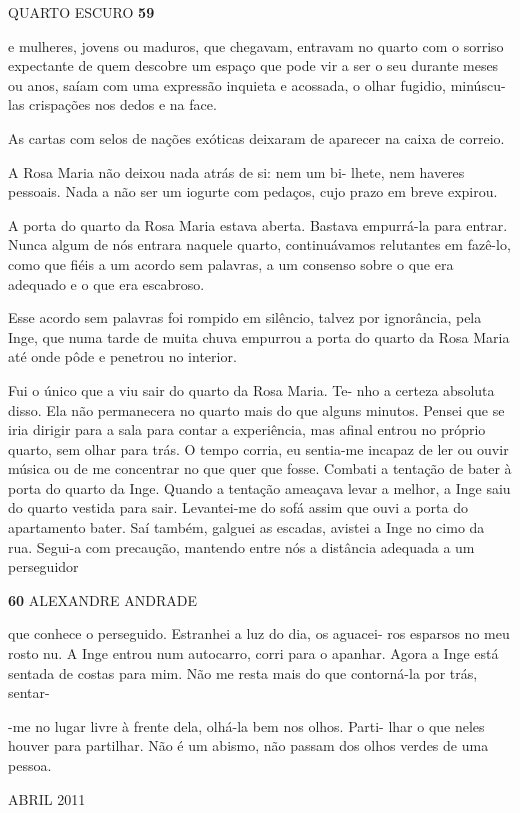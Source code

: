 QUARTO ESCURO \textbf{59}

e mulheres, jovens ou maduros, que chegavam, entravam no quarto com o
sorriso expectante de quem descobre um espaço que pode vir a ser o seu
durante meses ou anos, saíam com uma expressão inquieta e acossada, o
olhar fugidio, minúscu- las crispações nos dedos e na face.

As cartas com selos de nações exóticas deixaram de aparecer na caixa de
correio.

A Rosa Maria não deixou nada atrás de si: nem um bi- lhete, nem haveres
pessoais. Nada a não ser um iogurte com pedaços, cujo prazo em breve
expirou.

A porta do quarto da Rosa Maria estava aberta. Bastava empurrá-la para
entrar. Nunca algum de nós entrara naquele quarto, continuávamos
relutantes em fazê-lo, como que fiéis a um acordo sem palavras, a um
consenso sobre o que era adequado e o que era escabroso.

Esse acordo sem palavras foi rompido em silêncio, talvez por ignorância,
pela Inge, que numa tarde de muita chuva empurrou a porta do quarto da
Rosa Maria até onde pôde e penetrou no interior.

Fui o único que a viu sair do quarto da Rosa Maria. Te- nho a certeza
absoluta disso. Ela não permanecera no quarto mais do que alguns
minutos. Pensei que se iria dirigir para a sala para contar a
experiência, mas afinal entrou no próprio quarto, sem olhar para trás. O
tempo corria, eu sentia-me incapaz de ler ou ouvir música ou de me
concentrar no que quer que fosse. Combati a tentação de bater à porta do
quarto da Inge. Quando a tentação ameaçava levar a melhor, a Inge saiu
do quarto vestida para sair. Levantei-me do sofá assim que ouvi a porta
do apartamento bater. Saí também, galguei as escadas, avistei a Inge no
cimo da rua. Segui-a com precaução, mantendo entre nós a distância
adequada a um perseguidor

\textbf{60 }ALEXANDRE ANDRADE

que conhece o perseguido. Estranhei a luz do dia, os aguacei- ros
esparsos no meu rosto nu. A Inge entrou num autocarro, corri para o
apanhar. Agora a Inge está sentada de costas para mim. Não me resta mais
do que contorná-la por trás, sentar-

-me no lugar livre à frente dela, olhá-la bem nos olhos. Parti- lhar o
que neles houver para partilhar. Não é um abismo, não passam dos olhos
verdes de uma pessoa.

ABRIL 2011


